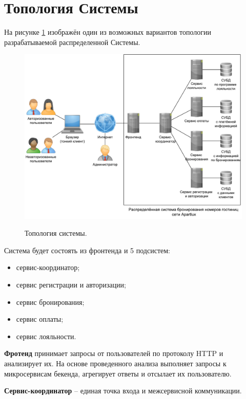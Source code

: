 \section*{Топология Системы}
На рисунке \ref{fig:topology} изображён один из возможных вариантов  топологии разрабатываемой распределенной Системы.
\begin{figure}[h]
	\begin{center}
		{\includegraphics[scale = 0.6]{img/pic/topology.pdf}}
		\caption{Топология системы.}
		\label{fig:topology}
	\end{center}
\end{figure}

\pagebreak
%
Система будет состоять из фронтенда и 5 подсистем:
\begin{itemize}
	\item сервис-координатор;
	
	\item сервис регистрации и авторизации;
	
	\item сервис бронирования;
	
	\item сервис оплаты;
	
	\item сервис лояльности.
\end{itemize}

\textbf{Фротенд} принимает запросы от пользователей по протоколу HTTP и анализирует их. На основе проведенного анализа выполняет запросы к микросервисам бекенда, агрегирует ответы и отсылает их пользователю.

\textbf{Сервис-координатор} -- единая точка входа и межсервисной коммуникации.

